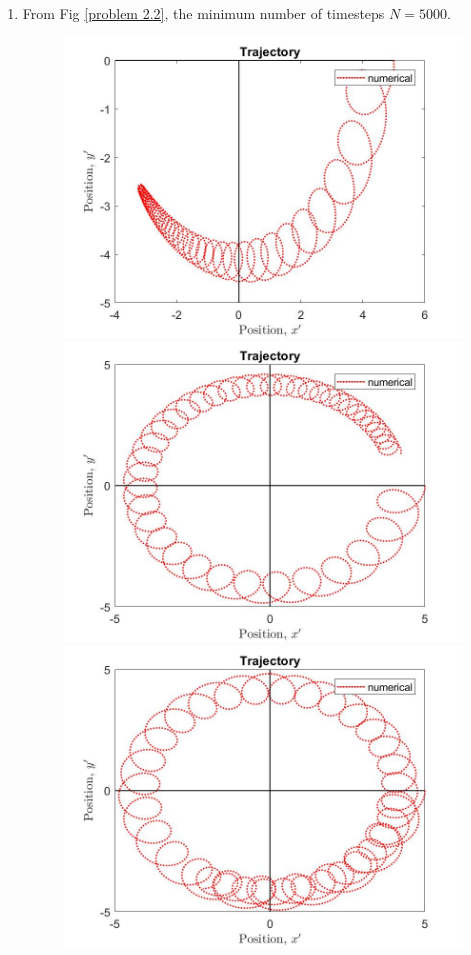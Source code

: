 \documentclass{article}
\begin{document}
\begin{enumerate}
\begin{enumerate}
\item
From Fig \ref{problem 2.2}, the minimum number of timesteps $N = 5000$.
\begin{figure}[h]
\centering
\vbox{
\includegraphics[scale=0.2]{problem2/1000.jpg}
\includegraphics[scale=0.2]{problem2/1500.jpg}
}
\vbox{
\includegraphics[scale=0.2]{problem2/2000.jpg}
}
\end{figure}
\end{enumerate}
\end{enumerate}
\end{document}
